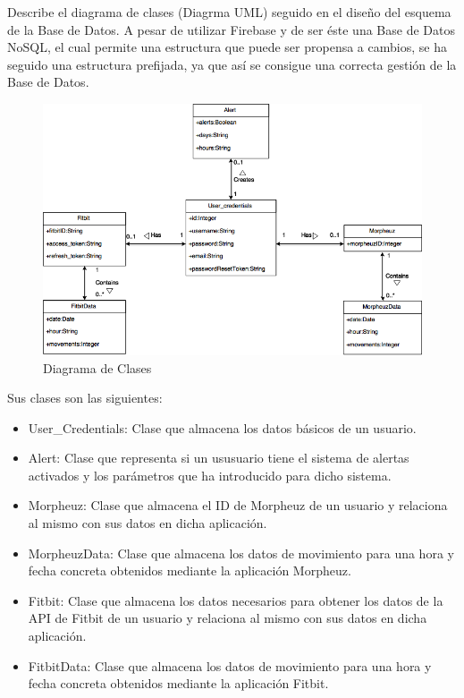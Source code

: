 \documentclass[11pt,openany]{book}
\begin{document}
Describe el diagrama de clases (Diagrma UML\cite{14}) seguido en el diseño del esquema de la Base de Datos. A pesar de utilizar Firebase y de ser éste una Base de Datos NoSQL, el cual permite una estructura que puede ser propensa a cambios, se ha seguido una estructura prefijada, ya que así se consigue una correcta gestión de la Base de Datos.

\begin{figure}[H]
\centering
\includegraphics[totalheight=8cm]{diagramas/Diagrama_de_Clases.png}
\caption{Diagrama de Clases}
\end{figure}

Sus clases son las siguientes:

\begin{itemize}
\item User\_Credentials: Clase que almacena los datos básicos de un usuario.
\item Alert: Clase que representa si un ususuario tiene el sistema de alertas activados y los parámetros que ha introducido para dicho sistema.
\item Morpheuz: Clase que almacena el ID de Morpheuz de un usuario y relaciona al mismo con sus datos en dicha aplicación.
\item MorpheuzData: Clase que almacena los datos de movimiento para una hora y fecha concreta obtenidos mediante la aplicación Morpheuz.
\item Fitbit: Clase que almacena los datos necesarios para obtener los datos de la API de Fitbit de un usuario y relaciona al mismo con sus datos en dicha aplicación.
\item FitbitData: Clase que almacena los datos de movimiento para una hora y fecha concreta obtenidos mediante la aplicación Fitbit.

\end{itemize}
\end{document}
